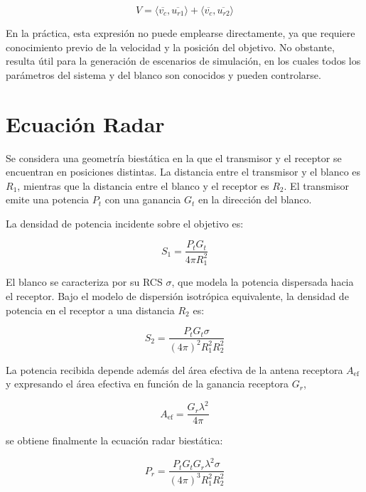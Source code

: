 	\begin{equation}
		\label{eq:vel_biestatica_proy}
		V = \langle \overline{v_c} , \overline{u_{r1}} \rangle + \langle \overline{v_c} , \overline{u_{r2}} \rangle
	\end{equation}

	En la práctica, esta expresión no puede emplearse directamente, ya que requiere conocimiento previo de la velocidad y la posición del objetivo. No obstante, resulta útil para la generación de escenarios de simulación, en los cuales todos los parámetros del sistema y del blanco son conocidos y pueden controlarse.



	\section{Ecuación Radar}

	Se considera una geometría biestática en la que el transmisor y el receptor se encuentran en posiciones distintas. La distancia entre el transmisor y el blanco es $R_{1}$, mientras que la distancia entre el blanco y el receptor es $R_{2}$. El transmisor emite una potencia $P_{t}$ con una ganancia $G_{t}$ en la dirección del blanco.

	La densidad de potencia incidente sobre el objetivo es:

	\begin{equation}
		S_{1}=\frac{P_{t} G_{t}}{4\pi R_{1}^{2}}
	\end{equation}

	El blanco se caracteriza por su RCS $\sigma$, que modela la potencia dispersada hacia el receptor. Bajo el modelo de dispersión isotrópica equivalente, la densidad de potencia en el receptor a una distancia $R_{2}$ es:

	\begin{equation}
		S_{2}=\frac{P_{t} G_{t} \sigma}{(4\pi)^{2} R_{1}^{2} R_{2}^{2}}
	\end{equation}

	La potencia recibida depende además del área efectiva de la antena receptora $A_{\text{ef}}$ y expresando el área efectiva en función de la ganancia receptora $G_{r}$,

	\begin{equation}
		A_{\text{ef}}=\frac{G_{r}\lambda^{2}}{4\pi}
	\end{equation}

	se obtiene finalmente la ecuación radar biestática:

	\begin{equation}
		P_{r}=\frac{P_{t} G_{t} G_{r} \lambda^{2} \sigma}{(4\pi)^{3} R_{1}^{2} R_{2}^{2}}
	\end{equation}

